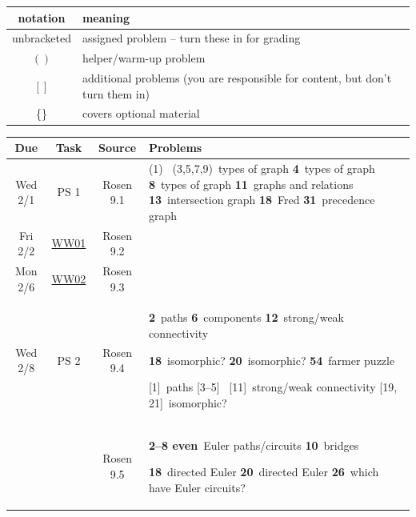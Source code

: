 \documentclass{scrartcl}
\def\WW#1{\href{https://mathwebwork.cs.calvin.edu/webwork2/Math252-S18-Pruim/WW#1}{WW#1}}
\def\hwn#1{\relax}
\def\hwn#1{\ {\tiny (#1)}}
\def\hwn#1{$_{\mbox{\ \tiny #1}}$}
\def\hwn#1{~{\tiny #1}}
\newcommand{\helper}[2][\relax]{(#2)\hwn{#1}}
\newcommand{\extra}[2][\relax]{[#2]\hwn{#1}}
\newcommand{\mand}[2][\relax]{{\bf \large #2}\hwn{#1}}
\begin{document}
\begin{center}

\iftrue

\begin{longtable}{|c|l|}
  \hline
  notation & meaning \\
  \hline
  unbracketed & assigned problem -- turn these in for grading \\
  $()$ & helper/warm-up problem  \\
  $[]$ & additional problems (you are responsible for content, but don't turn them in) \\
  \{\} & covers optional material \\
  \hline
\end{longtable}
\fi

\bigskip


\begin{longtable}{|c|c|c|p{4.3in}|}
  \hline
  Due & Task & Source & Problems \\
  \hline\hline
  \endhead
  	 Wed 2/1 & PS 1 & Rosen 9.1 &
	 \helper{1}
	 \helper[types of graph]{3,5,7,9}
	 \mand[types of graph]{4}
	 \mand[types of graph]{8}
	 \mand[graphs and relations]{11}
	 \mand[intersection graph]{13}
	 \mand[Fred]{18}
	 \mand[precedence graph]{31}
	 \\
	 \hline
	 Fri 2/2 & \WW{01} & Rosen 9.2 &
	 \\
	 \hline
	 Mon 2/6 & \WW{02} & Rosen 9.3 &
	 \\
	 \hline
	 Wed 2/8 & PS 2 & Rosen 9.4 &
	 \mand[paths]{2}
	 \mand[components]{6}
	 \mand[strong/weak connectivity]{12}

	 \mand[isomorphic?]{18}
	 \mand[isomorphic?]{20}
	 \mand[farmer puzzle]{54}

	 \extra[paths]{1}
	 \extra{3--5}
	 \extra[strong/weak connectivity]{11}
	 \extra[isomorphic?]{19, 21}
	 \\
	 & & Rosen 9.5 &
	 \mand[Euler paths/circuits]{2--8 even}
	 \mand[bridges]{10}

	 \mand[directed Euler]{18}
	 \mand[directed Euler]{20}
	 \mand[which have Euler circuits?]{26}


\end{longtable}
\end{center}
\end{document}
